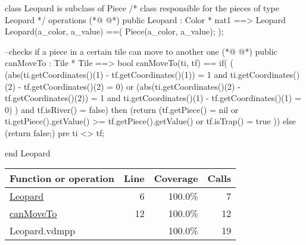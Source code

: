 \begin{vdmpp}[breaklines=true]
class Leopard is subclass of Piece
/*
class responsible for the pieces of type Leopard
*/
operations
(*@
\label{Leopard:6}
@*)
 public Leopard : Color * nat1 ==> Leopard
   Leopard(a_color, a_value) ==(
    Piece(a_color, a_value);
   );
   
--checks if a piece in a certain tile can move to another one
(*@
\label{canMoveTo:12}
@*)
 public canMoveTo : Tile * Tile  ==> bool
 canMoveTo(ti, tf) 
  ==  if(
       (
       (abs(ti.getCoordinates()(1) - tf.getCoordinates()(1)) = 1 and ti.getCoordinates()(2) - tf.getCoordinates()(2) = 0) or 
       (abs(ti.getCoordinates()(2) - tf.getCoordinates()(2)) = 1 and ti.getCoordinates()(1) - tf.getCoordinates()(1) = 0)
       ) 
      and tf.isRiver() = false)
       then (return (tf.getPiece() = nil or ti.getPiece().getValue() >= tf.getPiece().getValue() or tf.isTrap() = true )) 
    else (return false;)
 pre ti <> tf;

end Leopard
\end{vdmpp}
\bigskip
\begin{longtable}{|l|r|r|r|}
\hline
Function or operation & Line & Coverage & Calls \\
\hline
\hline
\hyperref[Leopard:6]{Leopard} & 6&100.0\% & 7 \\
\hline
\hyperref[canMoveTo:12]{canMoveTo} & 12&100.0\% & 12 \\
\hline
\hline
Leopard.vdmpp & & 100.0\% & 19 \\
\hline
\end{longtable}

